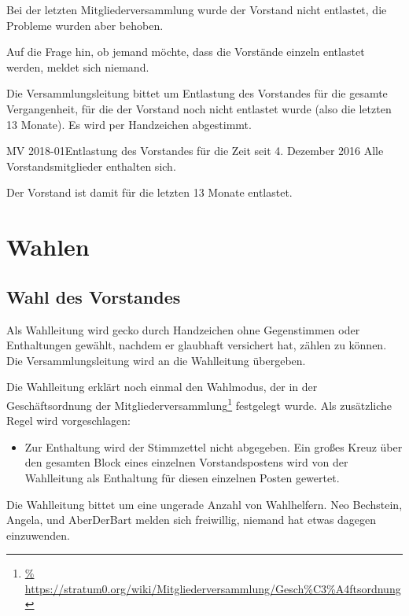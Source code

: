 \documentclass{s0minutes}
\begin{document}
Bei der letzten Mitgliederversammlung wurde der Vorstand nicht entlastet, die
Probleme wurden aber behoben.

Auf die Frage hin, ob jemand möchte, dass die Vorstände einzeln entlastet
werden, meldet sich niemand.

Die Versammlungsleitung bittet um Entlastung des Vorstandes für die gesamte
Vergangenheit, für die der Vorstand noch nicht entlastet wurde (also die letzten
13 Monate). Es wird per Handzeichen abgestimmt.

\begin{resolution}{MV 2018-01}{}{Entlastung des
  Vorstandes für die Zeit seit 4. Dezember 2016\hfill}{}
  Alle Vorstandsmitglieder enthalten sich.
\end{resolution}

Der Vorstand ist damit für die letzten 13 Monate entlastet.

\section{Wahlen}

\subsection{Wahl des Vorstandes}

Als Wahlleitung wird gecko durch Handzeichen ohne Gegenstimmen oder
Enthaltungen gewählt, nachdem er glaubhaft versichert hat, zählen zu können.
Die Versammlungsleitung wird an die Wahlleitung übergeben.

Die Wahlleitung erklärt noch einmal den Wahlmodus, der in der Geschäftsordnung
der Mitgliederversammlung\footnote{\url{%
https://stratum0.org/wiki/Mitgliederversammlung/Gesch\%C3\%A4ftsordnung}}
festgelegt wurde. Als zusätzliche Regel wird vorgeschlagen:

\begin{itemize}
  \item Zur Enthaltung wird der Stimmzettel nicht abgegeben. Ein großes Kreuz
    über den gesamten Block eines einzelnen Vorstandspostens wird von der
    Wahlleitung als Enthaltung für diesen einzelnen Posten gewertet.
\end{itemize}

Die Wahlleitung bittet um eine ungerade Anzahl von Wahlhelfern. Neo Bechstein,
Angela, und AberDerBart melden sich freiwillig, niemand hat etwas dagegen
einzuwenden.
\end{document}
